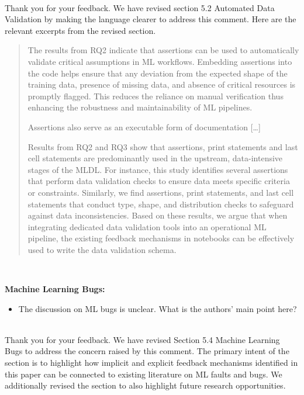 \documentclass[11pt,fleqn]{article}
\newcommand{\eline}{\vspace*{.75\baselineskip}}
\newcommand{\Referee}[1]{\eline \noindent {\bf Reviewer comment #1:} \\}
\newcommand{\Us}{\eline \noindent {\bf Response:}\\}
\newenvironment{revcomment}[1][]
{\Referee{#1}\begin{rcomment}}
{\end{rcomment}}
\begin{document}
\Us Thank you for your feedback. We have revised section 5.2 Automated Data Validation by making the language clearer to address this comment. Here are the relevant excerpts from the revised section.

\begin{quote}
  The results from RQ2 indicate that assertions can be used to automatically validate critical assumptions in ML workflows. Embedding assertions into the code helps ensure that any deviation from the expected shape of the training data, presence of missing data, and absence of critical resources is promptly flagged. This reduces the reliance on manual verification thus enhancing the robustness and maintainability of ML pipelines.

  Assertions also serve as an executable form of documentation [\ldots]

  Results from RQ2 and RQ3 show that assertions, print statements and last cell statements are predominantly used in the upstream, data-intensive stages of the MLDL. For instance, this study identifies several assertions that perform data validation checks to ensure data meets specific criteria or constraints. Similarly, we find assertions, print statements, and last cell statements that conduct type, shape, and distribution checks to safeguard against data inconsistencies. Based on these results, we argue that when integrating dedicated data validation tools into an operational ML pipeline, the existing feedback mechanisms in notebooks can be effectively used to write the data validation schema.
\end{quote}

\begin{revcomment}[3.13]
  \textbf{Machine Learning Bugs:}

  \begin{itemize}
    \item The discussion on ML bugs is unclear. What is the authors' main point here?
  \end{itemize}
\end{revcomment}

\Us Thank you for your feedback. We have revised Section 5.4 Machine Learning Bugs to address the concern raised by this comment. The primary intent of the section is to highlight how implicit and explicit feedback mechanisms identified in this paper can be connected to existing literature on ML faults and bugs. We additionally revised the section to also highlight future research opportunities.
\end{document}

